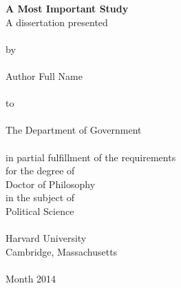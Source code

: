 \thispagestyle{empty}
\begin{center}
\vspace*{2.0 in}
{\LARGE \bf A Most Important Study}\\

\vspace{4em}  
A dissertation presented
\\~\\
by
\\~\\
{\large Author Full Name}
\\~\\
to
\\~\\
The Department of Government
\\~\\
in partial fulfillment of the requirements \\
for the degree of \\
Doctor of Philosophy\\
in the subject of\\
Political Science
\\~\\
Harvard University\\
Cambridge, Massachusetts
\\~\\
Month 2014
\end{center}
